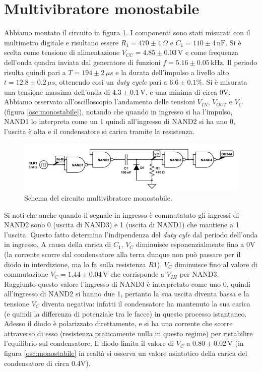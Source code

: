 \documentclass[10pt,a4paper]{article}
\begin{document}
\section{Multivibratore monostabile}

Abbiamo montato il circuito in figura \ref{fig:monostabile}. I componenti sono stati misurati con il multimetro digitale e risultano essere $R_1= 470\pm4\,\Omega$ e $C_1= 110\pm4 \,\text{nF} $. Si è scelta come tensione di alimentazione $V_{CC}= 4.85\pm0.03\,\text{V}$ e come frequenza dell'onda quadra inviata dal generatore di funzioni $f = 5.16\pm0.05\,\text{kHz}$. Il periodo risulta quindi pari a $T=194\pm2\,\mu s$ e la durata dell'impulso a livello alto $t=12.8\pm0.2\,\mu s$, ottenendo così un \emph{duty cycle} pari a $6.6\pm0.1\% $. Si è misurata una tensione massima dell'onda di $4.3\pm0.1\,\text{V}$, e una minima di circa 0V.\\
Abbiamo osservato all'oscilloscopio l'andamento delle tensioni $V_{IN}$, $V_{OUT}$ e $V_{C}$ (figura \ref{osc:monostabile}), notando che quando in ingresso si ha l'impulso, NAND1 lo interpreta come un 1 quindi all'ingresso di NAND2 si ha uno 0, l'uscita è alta e il condensatore si carica tramite la resistenza.\\
\begin{figure}[!htb]
  \centering
  \includegraphics[scale=0.75]{monostabile.png}
\caption{Schema del circuito multivibratore monostabile.\label{fig:monostabile}}
\end{figure}
Si noti che anche quando il segnale in ingresso è commutatato gli ingressi di NAND2 sono 0 (uscita di NAND3) e 1 (uscita di NAND1) che mantiene a 1 l'uscita. Questo fatto determina l'indipendenza del \emph{duty cyle} dal periodo dell'onda in ingresso. A causa della carica di $C_1$, $V_C$ diminuisce esponenzialmente fino a $0$V (la corrente scorre dal condensatore  alla terra dunque non può passare per il diodo in interdizione, ma lo fa sulla resistenza $R1$). $V_C$ diminuisce fino al valore di commutazione $V_C=1.44\pm0.04\,\text{V}$ che corrisponde a $V_{IH}$ per NAND3.\\
 Raggiunto questo valore l'ingresso di NAND3 è interpretato come uno 0, quindi all'ingresso di NAND2 si hanno due 1, pertanto la sua uscita diventa bassa e la tensione $V_C$ diventa negativa: infatti il condensatore ha mantenuto la sua carica (e quindi la differenza di potenziale tra le facce) in questo processo istantaneo. Adesso il diodo è polarizzato direttamente, e si ha una corrente che scorre attraverso di esso (resistenza praticamente nulla in questo regime) per ristabilire l'equilibrio sul condensatore. Il diodo limita il valore di $V_C$ a $0.80\pm0.02\,\text{V}$ (in figura \ref{osc:monostabile} in realtà si osserva un valore asintotico della carica del condensatore di circa 0.4V).\\
\end{document}
